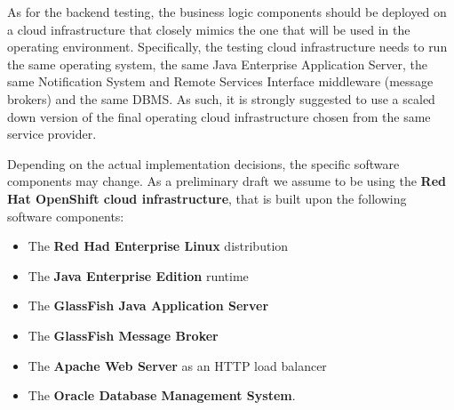 As for the backend testing, the business logic components should be deployed on a cloud infrastructure that closely mimics the one that will be used in the operating environment. 
Specifically, the testing cloud infrastructure needs to run the same operating system, the same Java Enterprise Application Server, the same Notification System and Remote Services Interface middleware (message brokers) and the same DBMS.
As such, it is strongly suggested to use a scaled down version of the final operating cloud infrastructure chosen from the same service provider. 

Depending on the actual implementation decisions, the specific software components may change. As a preliminary draft we assume to be using the \textbf{Red Hat OpenShift cloud infrastructure}, that is built upon the following software components:
\begin{itemize}
	\item The \textbf{Red Had Enterprise Linux} distribution
	\item The \textbf{Java Enterprise Edition} runtime
	\item The \textbf{GlassFish Java Application Server}
	\item The \textbf{GlassFish Message Broker}
	\item The \textbf{Apache Web Server} as an HTTP load balancer
	\item The \textbf{Oracle Database Management System}.
\end{itemize}

